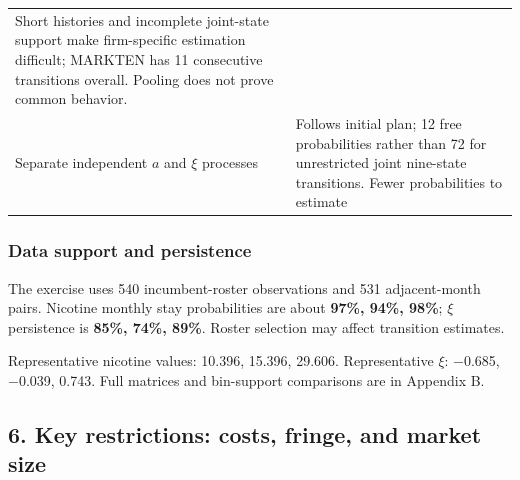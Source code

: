 \documentclass[11pt,]{article}
\begin{document}
\begin{longtable}[]{@{}ll@{}}
\begin{minipage}[t]{0.62\columnwidth}
Short histories and incomplete joint-state support make firm-specific
estimation difficult; MARKTEN has 11 consecutive transitions overall.
Pooling does not prove common behavior.\strut
\end{minipage}\tabularnewline
\begin{minipage}[t]{0.32\columnwidth}\raggedright\strut
Separate independent \(a\) and \(\xi\) processes\strut
\end{minipage} & \begin{minipage}[t]{0.62\columnwidth}\raggedright\strut
Follows initial plan; 12 free probabilities rather than 72 for
unrestricted joint nine-state transitions. Fewer probabilities to
estimate\strut
\end{minipage}\tabularnewline
\bottomrule
\end{longtable}

\subsubsection{Data support and
persistence}\label{data-support-and-persistence}

The exercise uses 540 incumbent-roster observations and 531
adjacent-month pairs. Nicotine monthly stay probabilities are about
\textbf{97\%, 94\%, 98\%}; \(\xi\) persistence is \textbf{85\%, 74\%,
89\%}. Roster selection may affect transition estimates.

Representative nicotine values: 10.396, 15.396, 29.606. Representative
\(\xi\): −0.685, −0.039, 0.743. Full matrices and bin-support
comparisons are in Appendix B.

\clearpage

\hypertarget{key-restrictions-costs-fringe-and-market-size}{\subsection{6.
Key restrictions: costs, fringe, and market
size}\label{key-restrictions-costs-fringe-and-market-size}}
\end{document}
